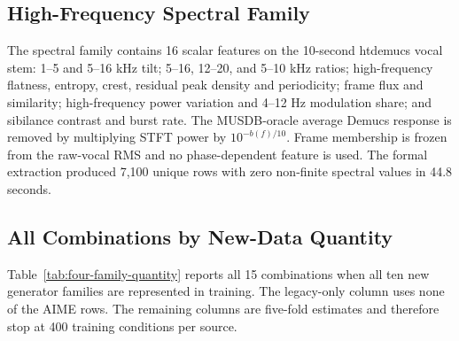 \subsection{High-Frequency Spectral Family}

The spectral family contains 16 scalar features on the 10-second htdemucs
vocal stem: 1--5 and 5--16 kHz tilt; 5--16, 12--20, and 5--10 kHz ratios;
high-frequency flatness, entropy, crest, residual peak density and periodicity;
frame flux and similarity; high-frequency power variation and 4--12 Hz
modulation share; and sibilance contrast and burst rate.  The MUSDB-oracle
average Demucs response is removed by multiplying STFT power by
$10^{-b(f)/10}$.  Frame membership is frozen from the raw-vocal RMS and no
phase-dependent feature is used.  The formal extraction produced 7,100 unique
rows with zero non-finite spectral values in 44.8 seconds.

\subsection{All Combinations by New-Data Quantity}

Table~\ref{tab:four-family-quantity} reports all 15 combinations when all ten
new generator families are represented in training.  The legacy-only column
uses none of the AIME rows.  The remaining columns are five-fold estimates and
therefore stop at 400 training conditions per source.

